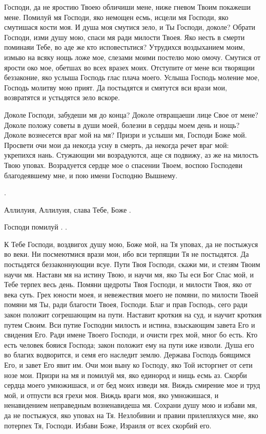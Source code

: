 \begin{mymulticols}


Господи, да не яростию Твоею обличиши мене, ниже гневом Твоим покажеши мене. Помилуй мя Господи, яко немощен есмь, исцели мя Господи, яко смутишася кости моя. И душа моя смутися зело, и Ты Господи, доколе? Обрати Господи, изми душу мою, спаси мя ради милости Твоея. Яко несть в смерти поминаяи Тебе, во аде же кто исповестьтися? Утрудихся воздыханием моим, измыю на всяку нощь ложе мое, слезами моими постелю мою омочу. Смутися от ярости око мое, обетшах во всех вразех моих. Отступите от мене вси творящии беззаконие, яко услыша Господь глас плача моего. Услыша Господь моление мое, Господь молитву мою прият. Да постыдятся и смятутся вси врази мои, возвратятся и устыдятся зело вскоре.




Доколе Господи, забудеши мя до конца? Доколе отвращаеши лице Свое от мене? Доколе положу советы в души моей, болезни в сердцы моем день и нощь? Доколе вознесется враг мой на мя? Призри и услыши мя, Господи Боже мой. Просвети очи мои да некогда усну в смерть, да некогда речет враг мой: укрепихся нань. Стужающии ми возрадуются, аще ся подвижу, аз же на милость Твою уповах. Возрадуется сердце мое о спасении Твоем, воспою Господеви благодеявшему мне, и пою имени Господню Вышнему.

. 

Аллилуия, Аллилуия, слава Тебе, Боже . 

Господи помилуй . .




К Тебе Господи, воздвигох душу мою, Боже мой, на Тя уповах, да не постыжуся во веки. Ни посмеютмися врази мои, ибо вси терпящии Тя не постыдятся. Да постыдятся беззаконнующии всуе. Пути Твоя Господи, скажи ми, и стезям Твоим научи мя. Настави мя на истину Твою, и научи мя, яко Ты еси Бог Спас мой, и Тебе терпех весь день. Помяни щедроты Твоя Господи, и милости Твоя, яко от века суть. Грех юности моея, и невежествия моего не помяни, по милости Твоей помяни мя Ты, ради благости Твоея, Господи. Благ и прав Господь, сего ради закон положит согрешающим на пути. Наставит кроткия на суд, и научит кроткия путем Своим. Вси путие Господни милость и истина, взыскающим завета Его и свидения Его. Ради имене Твоего Господи, и очисти грех мой, мног бо есть. Кто есть человек бояися Господа; закон положит ему на пути иже изволи. Душа его во благих водворится, и семя его наследит землю. Держава Господь боящимся Его, и завет Его явит им. Очи мои выну ко Господу, яко Той исторгнет от сети нозе мои. Призри на мя и помилуй мя, яко единород и нищь есмь аз. Скорби сердца моего умножишася, и от бед моих изведи мя. Виждь смирение мое и труд мой, и отпусти вся грехи моя. Виждь враги моя, яко умножишася, и ненавидением неправедным возненавидеша мя. Сохрани душу мою и избави мя, да не постыжуся, яко уповах на Тя. Незлобивии и правии прилепляхуся мне, яко потерпех Тя, Господи. Избави Боже, Израиля от всех скорбий его.



\end{mymulticols}
